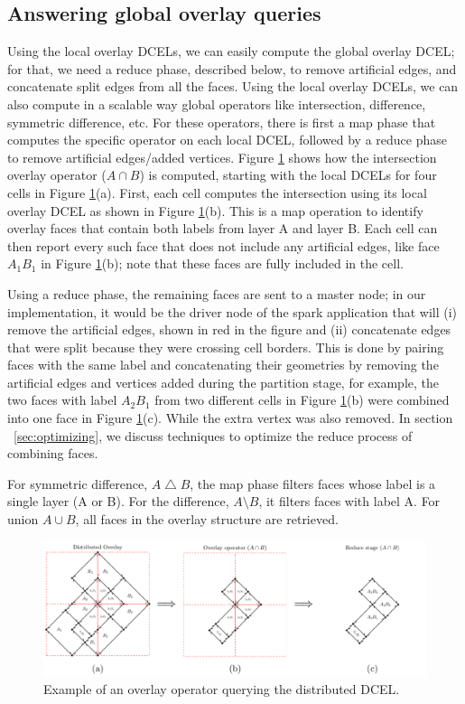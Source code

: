 \subsection{Answering global overlay queries} \label{sec:reduce}
Using the local overlay DCELs, we can easily compute the global overlay DCEL; for that, we need a reduce phase, described below, to remove artificial edges, and concatenate split edges from all the faces. Using the local overlay DCELs, we can also compute in a scalable way global operators like intersection, difference, symmetric difference, etc. For these operators, there is first a map phase that computes the specific operator on each local DCEL, followed by a reduce phase to remove artificial edges/added vertices.
Figure \ref{fig:overlay_operator} shows how the intersection overlay operator ($A \cap B$) is computed, starting with the local DCELs for four cells in Figure \ref{fig:overlay_operator}(a). First, each cell computes the intersection using its local overlay DCEL as shown in Figure \ref{fig:overlay_operator}(b). This is a map operation to identify overlay faces that contain both labels from layer A and layer B. Each cell can then report every such face that does not include any artificial edges, like face $A_1B_1$ in Figure \ref{fig:overlay_operator}(b); note that these faces are fully included in the cell. 

Using a reduce phase, the remaining faces are sent to a master node; in our implementation, it would be the driver node of the spark application that will (i) remove the artificial edges, shown in red in the figure and (ii) concatenate edges that were split because they were crossing cell borders. This is done by pairing faces with the same label and concatenating their geometries by removing the artificial edges and vertices added during the partition stage, for example, the two faces with label $A_2B_1$ from two different cells in Figure \ref{fig:overlay_operator}(b) were combined into one face in Figure \ref{fig:overlay_operator}(c). While the extra vertex was also removed. In section ~\ref{sec:optimizing}, we discuss techniques to optimize the reduce process of combining faces.

For symmetric difference, $A \bigtriangleup B$, the map phase filters faces whose label is a single layer (A or B). For the difference, $A \setminus B$, it filters faces with label A. For union $A \cup B$, all faces in the overlay structure are retrieved. 

\begin{figure}
    \centering
    \includegraphics[width=\linewidth]{chapter2/overlay_operator.pdf}    
    \caption{Example of an overlay operator querying the distributed DCEL.} \label{fig:overlay_operator}
\end{figure}


